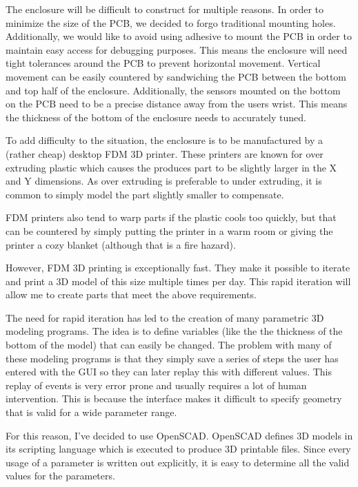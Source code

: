 
The enclosure will be difficult to construct for multiple reasons.  In order to
minimize the size of the PCB, we decided to forgo traditional mounting holes.
Additionally, we would like to avoid using adhesive to mount the PCB in order
to maintain easy access for debugging purposes.  This means the enclosure will
need tight tolerances around the PCB to prevent horizontal movement.  Vertical
movement can be easily countered by sandwiching the PCB between the bottom and
top half of the enclosure.  Additionally, the sensors mounted on the bottom on
the PCB need to be a precise distance away from the users wrist.  This means
the thickness of the bottom of the enclosure needs to accurately tuned.

To add difficulty to the situation, the enclosure is to be manufactured by a
(rather cheap) desktop FDM 3D printer.  These printers are known for over
extruding plastic which causes the produces part to be slightly larger in the X
and Y dimensions.  As over extruding is preferable to under extruding, it is
common to simply model the part slightly smaller to compensate.

FDM printers also tend to warp parts if the plastic cools too quickly, but that
can be countered by simply putting the printer in a warm room or giving the
printer a cozy blanket (although that is a fire hazard).

However, FDM 3D printing is exceptionally fast.  They make it possible to
iterate and print a 3D model of this size multiple times per day.  This rapid
iteration will allow me to create parts that meet the above requirements.

The need for rapid iteration has led to the creation of many parametric 3D
modeling programs.  The idea is to define variables (like the the thickness of
the bottom of the model) that can easily be changed.  The problem with many of
these modeling programs is that they simply save a series of steps the user has
entered with the GUI so they can later replay this with different values.  This
replay of events is very error prone and usually requires a lot of human
intervention.  This is because the interface makes it difficult to specify
geometry that is valid for a wide parameter range.

For this reason, I've decided to use OpenSCAD.  OpenSCAD defines 3D models in
its scripting language which is executed to produce 3D printable files.  Since
every usage of a parameter is written out explicitly, it is easy to determine
all the valid values for the parameters.

